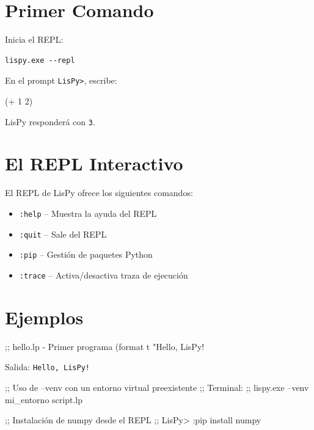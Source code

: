 \section{Primer Comando}

Inicia el REPL:

\begin{lstlisting}[style=python,title=Terminal]
lispy.exe --repl
\end{lstlisting}

En el prompt \texttt{LisPy>}, escribe:

\begin{lispcode}
(+ 1 2)
\end{lispcode}

LisPy responderá con \texttt{3}.

\section{El REPL Interactivo}

El REPL de LisPy ofrece los siguientes comandos:

\begin{itemize}
\item \texttt{:help} -- Muestra la ayuda del REPL
\item \texttt{:quit} -- Sale del REPL
\item \texttt{:pip} -- Gestión de paquetes Python
\item \texttt{:trace} -- Activa/desactiva traza de ejecución
\end{itemize}

\section{Ejemplos}

\begin{examplebox}
\begin{lispcode}
;; hello.lp - Primer programa
(format t "Hello, LisPy!~%
\end{lispcode}
Salida: \texttt{Hello, LisPy!}
\end{examplebox}

\begin{examplebox}
\begin{lispcode}
;; Uso de --venv con un entorno virtual preexistente
;; Terminal:
;;   lispy.exe --venv mi_entorno script.lp

;; Instalación de numpy desde el REPL
;; LisPy> :pip install numpy
\end{lispcode}
\end{examplebox}

